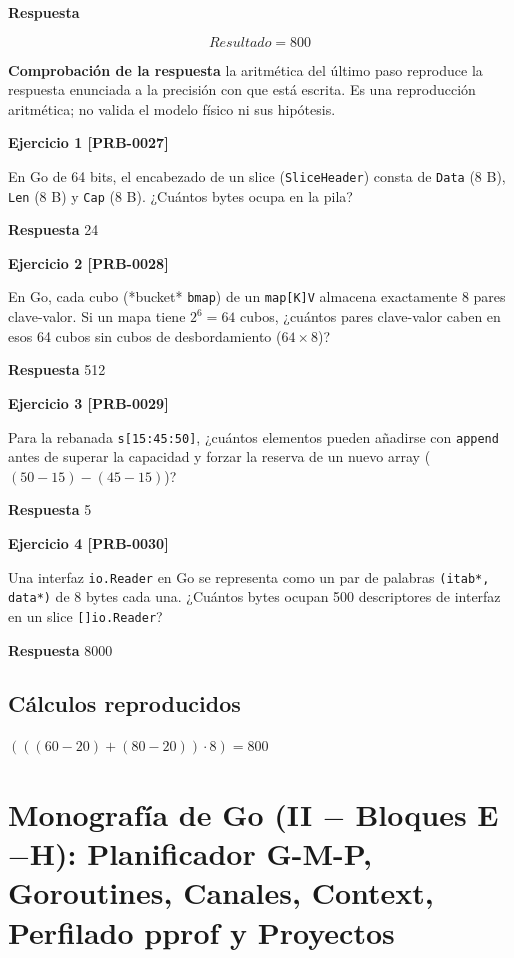 \documentclass{book}
\begin{document}
\noindent\textbf{Respuesta}

\[
Resultado = 800
\]

\noindent\textbf{Comprobación de la respuesta} la aritmética del último paso reproduce la respuesta enunciada a la precisión con que está escrita. Es una reproducción aritmética; no valida el modelo físico ni sus hipótesis.

\noindent\textbf{Ejercicio 1 [PRB-0027]}

En Go de 64 bits, el encabezado de un slice (\texttt{SliceHeader}) consta de \texttt{Data} (8 B), \texttt{Len} (8 B) y \texttt{Cap} (8 B). ¿Cuántos bytes ocupa en la pila?

\noindent\textbf{Respuesta} 24

\noindent\textbf{Ejercicio 2 [PRB-0028]}

En Go, cada cubo (*bucket* \texttt{bmap}) de un \texttt{map[K]V} almacena exactamente 8 pares clave-valor. Si un mapa tiene \(2^6 = 64\) cubos, ¿cuántos pares clave-valor caben en esos 64 cubos sin cubos de desbordamiento (\(64 \times 8\))?

\noindent\textbf{Respuesta} 512

\noindent\textbf{Ejercicio 3 [PRB-0029]}

Para la rebanada \texttt{s[15:45:50]}, ¿cuántos elementos pueden añadirse con \texttt{append} antes de superar la capacidad y forzar la reserva de un nuevo array (\((50 - 15) - (45 - 15)\))?

\noindent\textbf{Respuesta} 5

\noindent\textbf{Ejercicio 4 [PRB-0030]}

Una interfaz \texttt{io.Reader} en Go se representa como un par de palabras \texttt{(itab*, data*)} de 8 bytes cada una. ¿Cuántos bytes ocupan 500 descriptores de interfaz en un slice \texttt{[]io.Reader}?

\noindent\textbf{Respuesta} 8000

\subsection*{Cálculos reproducidos}

\(\left(\left(\left(60-20\right)+\left(80-20\right)\right)\cdot 8\right) = 800\)

\section{Monografía de Go (II \(-\) Bloques E\(-\)H): Planificador G-M-P, Goroutines, Canales, Context, Perfilado pprof y Proyectos}
\end{document}

